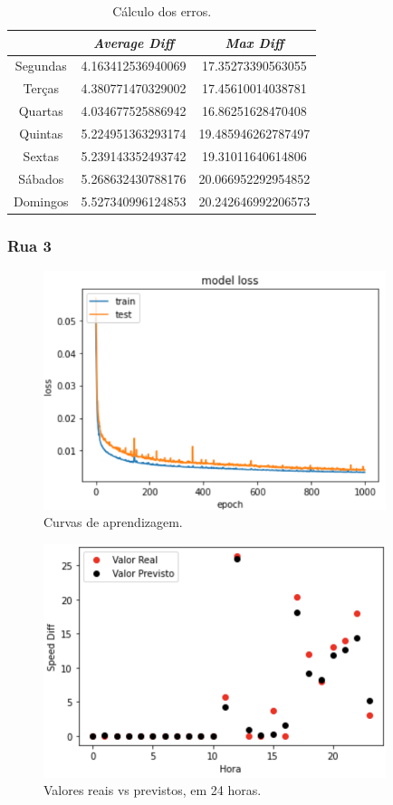 \documentclass[a4paper, 12pt]{article}
\begin{document}
\begin{table}[H]
	\centering
	\begin{tabular}{||c||c|c||}
		\hline\hline
		& \textit{Average Diff} & \textit{Max Diff} \\
		\hline\hline
		 Segundas & 
4.163412536940069 & 17.35273390563055 \\
		\hline
		 Terças  &
4.380771470329002
 & 17.45610014038781 \\
		\hline
		 Quartas & 4.034677525886942
 & 16.86251628470408	\\
		\hline
		 Quintas  & 5.224951363293174
 & 19.485946262787497	\\
		\hline
		 Sextas & 5.239143352493742
 & 19.31011640614806 \\
		\hline
		 Sábados  & 
5.268632430788176 & 20.066952292954852 \\
		\hline
		 Domingos & 5.527340996124853
 & 20.242646992206573

\\
		\hline\hline
	\end{tabular}
	\label{table:mod2_rua4}
	\caption{Cálculo dos erros.}
\end{table}

\subsubsection{Rua 3}

\begin{figure}[H]
	\centering
	\includegraphics[width=10cm]{resultados/curvas_aprend_3.png}
	\caption{Curvas de aprendizagem.}
\end{figure}

\begin{figure}[H]
	\centering
	\includegraphics[width=10cm]{resultados/real_prev_3.png}
	\caption{Valores reais vs previstos, em 24 horas.}
\end{figure}
\end{document}
